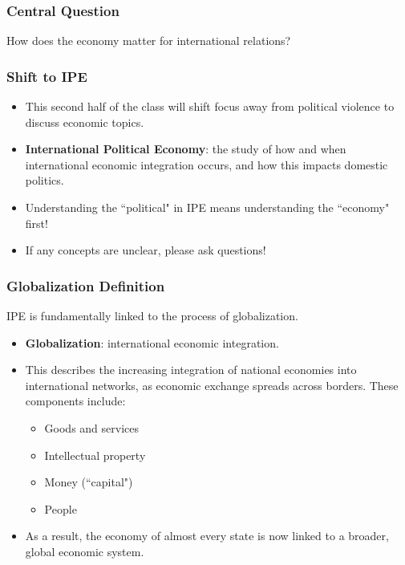 \documentclass{beamer}
\begin{document}
\begin{frame} 
	\frametitle{\LARGE{Central Question}}
    \centering
		\Large{How does the economy matter for international relations?}
\end{frame}

\begin{frame} 
	\frametitle{\LARGE{Shift to IPE}}
	\begin{itemize}
		\item This second half of the class will shift focus away from political violence to discuss economic topics. \pause
		\item \textbf{International Political Economy}: the study of how and when international economic integration occurs, and how this impacts domestic politics. \pause
		\item Understanding the ``political" in IPE means understanding the ``economy" first! \pause 
		\item If any concepts are unclear, please ask questions!  
	\end{itemize}
\end{frame}

\begin{frame} 
	\frametitle{\LARGE{Globalization Definition}}
IPE is fundamentally linked to the process of globalization.
	\begin{itemize}
			\item \textbf{Globalization}: international economic integration. \pause
			\item This describes the  increasing integration of national economies into international networks, as economic exchange spreads across borders. These components include: \pause
			\begin{itemize}
				\item Goods and services
				\item Intellectual property
				\item Money (``capital")
				\item People \pause
			\end{itemize}
		\item As a result, the economy of almost every state is now linked to a broader, global economic system.
	\end{itemize}
\end{frame}
\end{document}
